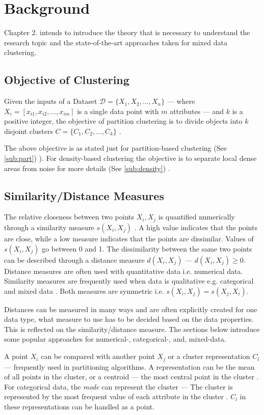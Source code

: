 \documentclass[../report.tex]{subfiles}
\begin{document}
\chapter{Background}
Chapter 2. intends to introduce the theory that is necessary to understand the research topic and the state-of-the-art approaches taken for mixed data clustering.

\section{Objective of Clustering}
Given the inputs of a Dataset $\mathcal{D} = \{X_{ 1 }, X_{ 2 },..., X_{ n } \}$ --- where $X_i = [x_{i1}, x_{i2},...,x_{im} ]$ is a single data point with $m$ attributes --- and $k$ is a positive integer, the objective of partition clustering is to divide objects into $k$ disjoint clusters ${C} = \{C_1, C_2,..., C_k \}$ \cite{Huang97clusteringlarge}.

The above objective is as stated just for partition-based clustering (See \ref{sub:part})
). For density-based clustering the objective is to separate local dense areas from noise for more details (See \ref{sub:density}) \cite{Ester1996}.

\section{Similarity/Distance Measures}
\label{ch:sim}
The relative closeness between two points $X_i, X_j$ is quantified numerically through a similarity measure $s(X_i, X_j)$ \cite{diday1976clustering}. A high value indicates that the points are close, while a low measure indicates that the points are dissimilar. Values of $s(X_i, X_j)$ go between 0 and 1.
The dissimilarity between the same two points can be described through a distance measure $d(X_i, X_j)$ --- $d(X_i, X_j) \geq 0$. Distance measures are often used with quantitative data i.e. numerical data. Similarity measures are frequently used when data is qualitative e.g. categorical and mixed data \cite{Wunsch2005}. Both measures are symmetric i.e. $s(X_i, X_j) = s(X_j, X_i)$.

Distances can be measured in many ways and are often explicitly created for one data type, what measure to use has to be decided based on the data properties. This is reflected on the similarity/distance measure. The sections below introduce some popular approaches for numerical-, categorical-, and, mixed-data.

A point $X_i$ can be compared with another point $X_j$ or a cluster representation $C_l$ --- frequently used in partitioning algorithms. A representation can be the mean of all points in the cluster, or a centroid --- the most central point in the cluster \cite{Guha2000, Kaufman1990}. For categorical data, the \textit{mode} can represent the cluster --- The cluster is represented by the most frequent value of each attribute in the cluster \cite{Ng1999}. $C_l$ in these representations can be handled as a point.
\end{document}
